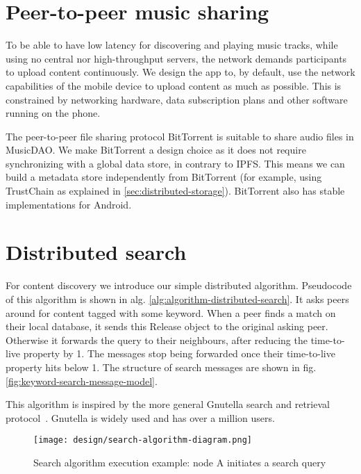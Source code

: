 \section{Peer-to-peer music sharing}
\label{sec:p2p-music-sharing}
To be able to have low latency for discovering and playing music tracks, while using no central nor high-throughput servers, the network demands participants to upload content continuously. We design the app to, by default, use the network capabilities of the mobile device to upload content as much as possible. This is constrained by networking hardware, data subscription plans and other software running on the phone.

The peer-to-peer file sharing protocol BitTorrent is suitable to share audio files in MusicDAO. We make BitTorrent a design choice as it does not require synchronizing with a global data store, in contrary to IPFS. This means we can build a metadata store independently from BitTorrent (for example, using TrustChain as explained in \ref{sec:distributed-storage}). BitTorrent also has stable implementations for Android.

\section{Distributed search}
For content discovery we introduce our simple distributed algorithm. Pseudocode of this algorithm is shown in alg. \ref{alg:algorithm-distributed-search}. It asks peers around for content tagged with some keyword. When a peer finds a match on their local database, it sends this Release object to the original asking peer. Otherwise it forwards the query to their neighbours, after reducing the time-to-live property by 1. The messages stop being forwarded once their time-to-live property hits below 1. The structure of search messages are shown in fig. \ref{fig:keyword-search-message-model}. 

This algorithm is inspired by the more general Gnutella search and retrieval protocol~\citep{kronfol2002fasd}. Gnutella is widely used and has over a million users.



\begin{figure}
    \centering
    \texttt{[image: design/search-algorithm-diagram.png]}
    \caption{Search algorithm execution example: node A initiates a search query}
    \label{fig:search-algorithm-diagram}
\end{figure}

